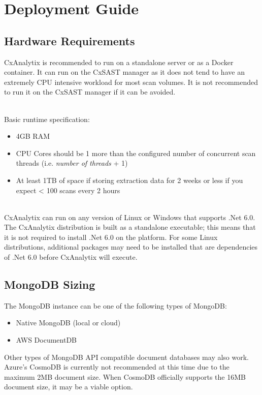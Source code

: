 \chapter{Deployment Guide}


\section{Hardware Requirements}

CxAnalytix is recommended to run on a standalone server or as a Docker container. It can run on the CxSAST manager 
as it does not tend to have an extremely CPU intensive workload for most scan volumes. It is not recommended to run it on the CxSAST manager 
if it can be avoided.

\noindent\\
Basic runtime specification:
    \begin{itemize}
        \item 4GB RAM
        \item CPU Cores should be 1 more than the configured number of concurrent scan threads (i.e. \textit{number of threads} + 1)
        \item At least 1TB of space if storing extraction data for 2 weeks or less if you expect < 100 scans every 2 hours
    \end{itemize}

\noindent\\CxAnalytix can run on any version of Linux or Windows that supports .Net 6.0.  The CxAnalytix distribution is built
as a standalone executable; this means that it is not required to install .Net 6.0 on the platform.  For some Linux distributions,
additional packages may need to be installed that are dependencies of .Net 6.0 before CxAnalytix will execute.

\section{MongoDB Sizing}

The MongoDB instance can be one of the following types of MongoDB:

\begin{itemize}
    \item Native MongoDB (local or cloud)
    \item AWS DocumentDB
\end{itemize}

\noindent Other types of MongoDB API compatible document databases may also work.  Azure's CosmoDB is currently not recommended at this time due to the 
maximum 2MB document size.  When CosmoDB officially supports the 16MB document size, it may be a viable option.

